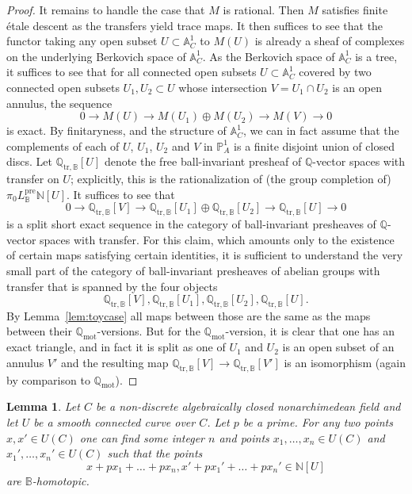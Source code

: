 \documentclass[11pt]{amsart}
\numberwithin{equation}{section}
\numberwithin{theorem}{section}
\newtheorem{lemma}[theorem]{Lemma}
\theoremstyle{definition}
\begin{document}
\begin{proof}
It remains to handle the case that $M$ is rational. Then $M$ satisfies finite \'etale descent as the transfers yield trace maps. It then suffices to see that the functor taking any open subset $U\subset \mathbb A^1_C$ to $M(U)$ is already a sheaf of complexes on the underlying Berkovich space of $\mathbb A^1_C$. As the Berkovich space of $\mathbb A^1_C$ is a tree, it suffices to see that for all connected open subsets $U\subset \mathbb A^1_C$ covered by two connected open subsets $U_1,U_2\subset U$ whose intersection $V=U_1\cap U_2$ is an open annulus, the sequence
\[
0\to M(U)\to M(U_1)\oplus M(U_2)\to M(V)\to 0
\]
is exact. By finitaryness, and the structure of $\mathbb A^1_C$, we can in fact assume that the complements of each of $U$, $U_1$, $U_2$ and $V$ in $\mathbb P^1_A$ is a finite disjoint union of closed discs. Let $\mathbb Q_{\mathrm{tr},\mathbb B}[U]$ denote the free ball-invariant presheaf of $\mathbb Q$-vector spaces with transfer on $U$; explicitly, this is the rationalization of (the group completion of) $\pi_0 L_{\mathbb B}^{\mathrm{pre}} \mathbb N[U]$. It suffices to see that
\[
0\to \mathbb Q_{\mathrm{tr},\mathbb B}[V]\to \mathbb Q_{\mathrm{tr},\mathbb B}[U_1]\oplus \mathbb Q_{\mathrm{tr},\mathbb B}[U_2]\to \mathbb Q_{\mathrm{tr},\mathbb B}[U]\to 0
\]
is a split short exact sequence in the category of ball-invariant presheaves of $\mathbb Q$-vector spaces with transfer. For this claim, which amounts only to the existence of certain maps satisfying certain identities, it is sufficient to understand the very small part of the category of ball-invariant presheaves of abelian groups with transfer that is spanned by the four objects
\[
\mathbb Q_{\mathrm{tr},\mathbb B}[V], \mathbb Q_{\mathrm{tr},\mathbb B}[U_1], \mathbb Q_{\mathrm{tr},\mathbb B}[U_2], \mathbb Q_{\mathrm{tr},\mathbb B}[U].
\]
By Lemma~\ref{lem:toycase} all maps between those are the same as the maps between their $\mathbb Q_{\mathrm{mot}}$-versions. But for the $\mathbb Q_{\mathrm{mot}}$-version, it is clear that one has an exact triangle, and in fact it is split as one of $U_1$ and $U_2$ is an open subset of an annulus $V'$ and the resulting map $\mathbb Q_{\mathrm{tr},\mathbb B}[V]\to \mathbb Q_{\mathrm{tr},\mathbb B}[V']$ is an isomorphism (again by comparison to $\mathbb Q_{\mathrm{mot}}$).
\end{proof}

\begin{lemma}\label{lem:dividebypcurve} Let $C$ be a non-discrete algebraically closed nonarchimedean field and let $U$ be a smooth connected curve over $C$. Let $p$ be a prime. For any two points $x,x'\in U(C)$ one can find some integer $n$ and points $x_1,\ldots,x_n\in U(C)$ and $x_1',\ldots,x_n'\in U(C)$ such that the points
\[
x+px_1+\ldots+px_n,x'+px_1'+\ldots+px_n'\in \mathbb N[U]
\]
are $\mathbb B$-homotopic.
\end{lemma}
\end{document}
